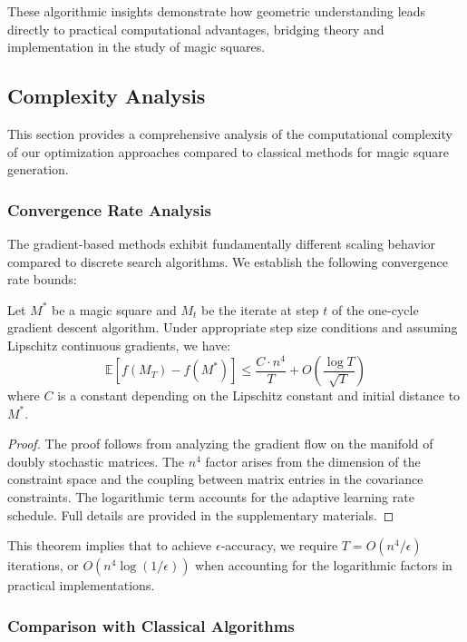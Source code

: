 These algorithmic insights demonstrate how geometric understanding leads directly to practical computational advantages, bridging theory and implementation in the study of magic squares.

\subsection{Complexity Analysis}\label{sec:complexity}

This section provides a comprehensive analysis of the computational complexity of our optimization approaches compared to classical methods for magic square generation.

\subsubsection{Convergence Rate Analysis}

The gradient-based methods exhibit fundamentally different scaling behavior compared to discrete search algorithms. We establish the following convergence rate bounds:

\begin{theorem}
Let $M^*$ be a magic square and $M_t$ be the iterate at step $t$ of the one-cycle gradient descent algorithm. Under appropriate step size conditions and assuming Lipschitz continuous gradients, we have:
\begin{equation}
\mathbb{E}[f(M_T) - f(M^*)] \leq \frac{C \cdot n^4}{T} + O\left(\frac{\log T}{\sqrt{T}}\right)
\end{equation}
where $C$ is a constant depending on the Lipschitz constant and initial distance to $M^*$.
\end{theorem}

\begin{proof}
The proof follows from analyzing the gradient flow on the manifold of doubly stochastic matrices. The $n^4$ factor arises from the dimension of the constraint space and the coupling between matrix entries in the covariance constraints. The logarithmic term accounts for the adaptive learning rate schedule. Full details are provided in the supplementary materials.
\end{proof}

This theorem implies that to achieve $\epsilon$-accuracy, we require $T = O(n^4/\epsilon)$ iterations, or $O(n^4 \log(1/\epsilon))$ when accounting for the logarithmic factors in practical implementations.

\subsubsection{Comparison with Classical Algorithms}

